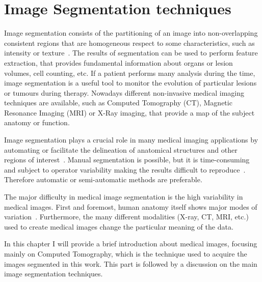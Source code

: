 \documentclass{standalone}
\begin{document}
\chapter{Image Segmentation techniques}
	Image segmentation consists of the partitioning of an image into non-overlapping consistent regions that are homogeneous respect to some characteristics, such as intensity or texture~\cite{ART:Pham}.
	The results of segmentation can be used to perform feature extraction, that provides fundamental information about organs or lesion volumes, cell counting, etc. If a patient performs many analysis during the time, image segmentation is a useful tool to monitor the evolution of particular lesions or tumours during therapy.
	Nowadays different non-invasive medical imaging techniques are available, such as Computed Tomography (CT), Magnetic Resonance Imaging (MRI) or X-Ray imaging, that provide a map of the subject anatomy or function. 
	
	Image segmentation plays a crucial role in many medical imaging applications by automating or facilitate the delineation of anatomical structures and other regions of interest~\cite{ART:Pham}.  Manual segmentation is possible, but it is time-consuming and subject to operator variability making the results difficult to reproduce~\cite{INP:Withey}. Therefore automatic or semi-automatic methods are preferable. 
	
	The major difficulty in medical image segmentation is the high variability in medical images. First and foremost, human anatomy itself shows major modes of variation~\cite{ART:Pooja}. Furthermore, the many different modalities (X-ray, CT, MRI, etc.) used to create medical images change the particular meaning of the data.
	
	In this chapter I will provide a brief introduction about medical images, focusing mainly on Computed Tomography, which is the technique used to acquire the images segmented in this work. 	
	This part is followed by a discussion on the main image segmentation techniques.
	
\end{document}
